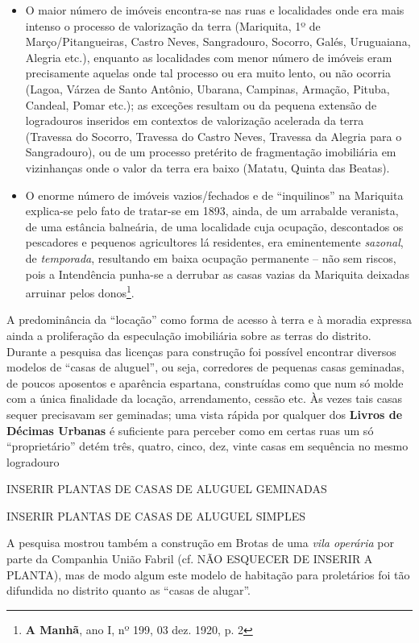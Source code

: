 \begin{itemize}
\item O maior número de imóveis encontra-se nas ruas e localidades onde era mais intenso o processo de valorização da terra (Mariquita, 1º de Março/Pitangueiras, Castro Neves, Sangradouro, Socorro, Galés, Uruguaiana, Alegria etc.), enquanto as localidades com menor número de imóveis eram precisamente aquelas onde tal processo ou era muito lento, ou não ocorria (Lagoa, Várzea de Santo Antônio, Ubarana, Campinas, Armação, Pituba, Candeal, Pomar etc.); as exceções resultam ou da pequena extensão de logradouros inseridos em contextos de valorização acelerada da terra (Travessa do Socorro, Travessa do Castro Neves, Travessa da Alegria para o Sangradouro), ou de um processo pretérito de fragmentação imobiliária em vizinhanças onde o valor da terra era baixo (Matatu, Quinta das Beatas).
\item O enorme número de imóveis vazios/fechados e de ``inquilinos'' na Mariquita explica-se pelo fato de tratar-se em 1893, ainda, de um arrabalde veranista, de uma estância balneária, de uma localidade cuja ocupação, descontados os pescadores e pequenos agricultores lá residentes, era eminentemente \textit{sazonal}, de \textit{temporada}, resultando em baixa ocupação permanente -- não sem riscos, pois a Intendência punha-se a derrubar as casas vazias da Mariquita deixadas arruinar pelos donos\footnote{\textbf{A Manhã}, ano I, nº 199, 03 dez. 1920, p. 2}.
\end{itemize}

A predominância da ``locação'' como forma de acesso à terra e à moradia expressa ainda a proliferação da especulação imobiliária sobre as terras do distrito. Durante a pesquisa das licenças para construção foi possível encontrar diversos modelos de ``casas de aluguel'', ou seja, corredores de pequenas casas geminadas, de poucos aposentos e aparência espartana, construídas como que num só molde com a única finalidade da locação, arrendamento, cessão etc. Às vezes tais casas sequer precisavam ser geminadas; uma vista rápida por qualquer dos \textbf{Livros de Décimas Urbanas} é suficiente para perceber como em certas ruas um só ``proprietário'' detém três, quatro, cinco, dez, vinte casas em sequência no mesmo logradouro

INSERIR PLANTAS DE CASAS DE ALUGUEL GEMINADAS

INSERIR PLANTAS DE CASAS DE ALUGUEL SIMPLES

A pesquisa mostrou também a construção em Brotas de uma \textit{vila operária} por parte da Companhia União Fabril (cf. NÃO ESQUECER DE INSERIR A PLANTA), mas de modo algum este modelo de habitação para proletários foi tão difundida no distrito quanto as ``casas de alugar''.

